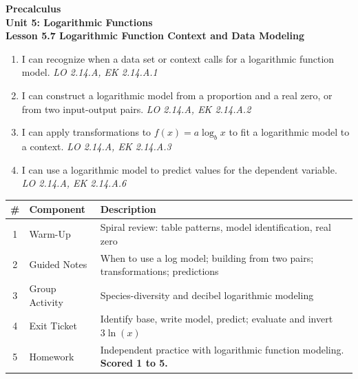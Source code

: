 \documentclass[10pt]{article}
\begin{document}
\vspace{-0.8in}

\begin{center}
  {\color{white}\textbf{\LARGE Precalculus}}\\[4pt]
  {\color{skymid}\large\textbf{Unit 5: Logarithmic Functions}}\\[6pt]
  {\color{white}\textbf{\large Lesson 5.7 \quad Logarithmic Function Context and Data Modeling}}
\end{center}

\vspace{0.22in}
\namedateperiod
\vspace{0.18in}

\begin{learningtargetbox}
\small
\begin{enumerate}[leftmargin=1.5em, itemsep=5pt]
  \item I can recognize when a data set or context calls for a logarithmic function model.
        \hfill\textit{LO 2.14.A, EK 2.14.A.1}
  \item I can construct a logarithmic model from a proportion and a real zero, or from two
        input-output pairs.
        \hfill\textit{LO 2.14.A, EK 2.14.A.2}
  \item I can apply transformations to $f(x) = a\log_b x$ to fit a logarithmic model to
        a context.
        \hfill\textit{LO 2.14.A, EK 2.14.A.3}
  \item I can use a logarithmic model to predict values for the dependent variable.
        \hfill\textit{LO 2.14.A, EK 2.14.A.6}
\end{enumerate}
\end{learningtargetbox}

\vspace{0.14in}

\begin{tocbox}
\small
\renewcommand{\arraystretch}{1.5}
\begin{tabularx}{\linewidth}{@{} c l X @{}}
\rowcolor{sky}
\textbf{\#} & \textbf{Component} & \textbf{Description} \\
\midrule
1 & Warm-Up      & Spiral review: table patterns, model identification, real zero \\
2 & Guided Notes & When to use a log model; building from two pairs; transformations; predictions \\
3 & Group Activity & Species-diversity and decibel logarithmic modeling \\
4 & Exit Ticket  & Identify base, write model, predict; evaluate and invert $3\ln(x)$ \\
5 & Homework     & Independent practice with logarithmic function modeling. \textbf{Scored 1 to 5.} \\
\end{tabularx}
\end{tocbox}
\end{document}

